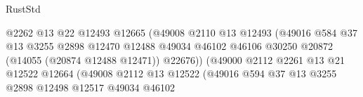 \begin{lexlean}{RustStd}
\begin{coremodule}
                                                @2262
                                                @13
                                                @22
                                                @12493
                                                @12665
                                                (@49008
                                                  @2110
                                                  @13
                                                  @12493
                                                  (@49016
                                                    @584
                                                    @37
                                                    @13
                                                    @3255
                                                    @2898
                                                    @12470
                                                    @12488
                                                    @49034
                                                    @46102
                                                    @46106
                                                    @30250
                                                    @20872
                                                    (@14055 (@20874 @12488 @12471))
                                                    @22676))
                                                (@49000
                                                  @2112
                                                  @2261
                                                  @13
                                                  @21
                                                  @12522
                                                  @12664
                                                  (@49008
                                                    @2112
                                                    @13
                                                    @12522
                                                    (@49016
                                                      @594
                                                      @37
                                                      @13
                                                      @3255
                                                      @2898
                                                      @12498
                                                      @12517
                                                      @49034
                                                      @46102

\end{coremodule}
\end{lexlean}
